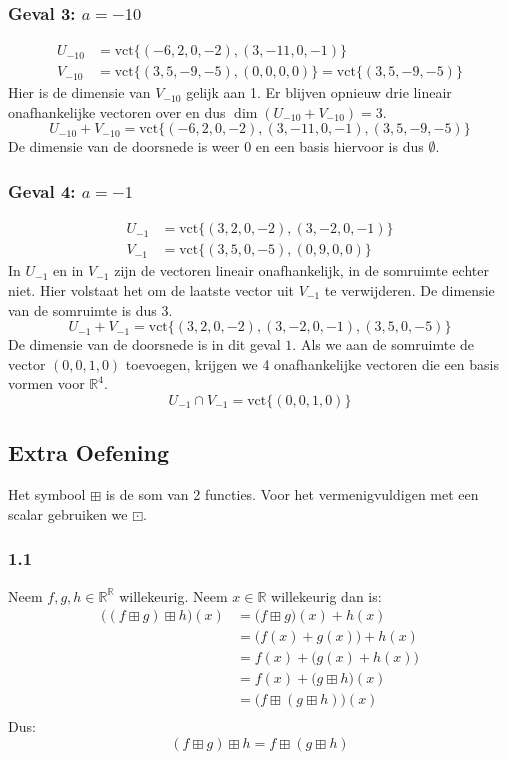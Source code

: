 \documentclass[lineaire_algebra_oplossingen.tex]{subfiles}
\begin{document}
\subsubsection*{Geval 3: $a=-10$}
\begin{align*}
U_{-10} &= \text{vct}\{(-6,2,0,-2),(3,-11,0,-1)\} \\
V_{-10} &= \text{vct}\{(3,5,-9,-5),(0,0,0,0)\} = \text{vct}\{(3,5,-9,-5)\}
\end{align*}
Hier is de dimensie van $V_{-10}$ gelijk aan 1. Er blijven opnieuw drie lineair onafhankelijke vectoren over en dus $\dim(U_{-10}+V_{-10})=3$.
\[
U_{-10}+V_{-10} = \text{vct}\{(-6,2,0,-2),(3,-11,0,-1),(3,5,-9,-5)\}
\]
De dimensie van de doorsnede is weer $0$ en een basis hiervoor is dus $\emptyset$.
\subsubsection*{Geval 4: $a=-1$}
\begin{align*}
U_{-1} &= \text{vct}\{(3,2,0,-2),(3,-2,0,-1)\} \\
V_{-1} &= \text{vct}\{(3,5,0,-5),(0,9,0,0)\}
\end{align*}
In $U_{-1}$ en in $V_{-1}$ zijn de vectoren lineair onafhankelijk, in de somruimte echter niet. Hier volstaat het om de laatste vector uit $V_{-1}$ te verwijderen. De dimensie van de somruimte is dus 3.
\[
U_{-1}+V_{-1} = \text{vct}\{(3,2,0,-2),(3,-2,0,-1),(3,5,0,-5)\}
\]
De dimensie van de doorsnede is in dit geval $1$. Als we aan de somruimte de vector $(0,0,1,0)$ toevoegen, krijgen we 4 onafhankelijke vectoren die een basis vormen voor $\mathbb{R}^4$.
\[
U_{-1} \cap V_{-1} = \text{vct}\{(0,0,1,0)\}
\]

\subsection{Extra Oefening}
Het symbool $\boxplus$ is de som van 2 functies. Voor het vermenigvuldigen met een scalar gebruiken we $\boxdot$.
\subsubsection*{1.1}
Neem $f,g,h \in \mathbb{R}^{\mathbb{R}}$ willekeurig. Neem $x \in \mathbb{R}$ willekeurig dan is:
\begin{align*}
\big( (f \boxplus g) \boxplus h \big) (x)
&= \big( f \boxplus g \big)(x) + h(x)\\
&= \big( f(x) + g(x) \big) + h(x)\\
&= f(x) + \big( g(x) + h(x) \big)\\
&= f(x) + \big( g \boxplus h\big) (x)\\
&= \big( f \boxplus (g \boxplus h) \big) (x)\\
\end{align*}
Dus:
\[
(f \boxplus g) \boxplus h = f \boxplus (g \boxplus h)
\]
\end{document}
